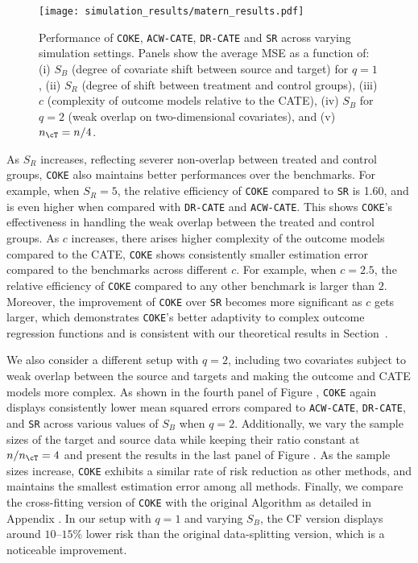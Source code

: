 \documentclass[12pt,a4paper,pdftex,onepage]{article}
\begin{document}
\begin{figure}[htbp!]
\centering
\texttt{[image: simulation\_results/matern\_results.pdf]}
\caption{Performance of \texttt{COKE}, \texttt{ACW-CATE}, \texttt{DR-CATE} and \texttt{SR} across varying simulation settings. Panels show the average MSE as a function of: (i) $S_B$ (degree of covariate shift between source and target) for $q = 1$, (ii) $S_R$ (degree of shift between treatment and control groups), (iii) $c$ (complexity of outcome models relative to the CATE), (iv) $S_B$ for $q = 2$ (weak overlap on two-dimensional covariates), and (v) $n_{\cT}=n/4$.}
\label{fig:matern}
\end{figure}

As $S_R$ increases, reflecting severer non-overlap between treated and control groups, \texttt{COKE} also maintains better performances over the benchmarks. For example, when $S_R = 5$, the relative efficiency of \texttt{COKE} compared to \texttt{SR} is 1.60, and is even higher when compared with \texttt{DR-CATE} and \texttt{ACW-CATE}. This shows \texttt{COKE}’s effectiveness in handling the weak overlap between the treated and control groups. As $c$ increases, there arises higher complexity of the outcome models compared to the CATE, \texttt{COKE} shows consistently smaller estimation error compared to the benchmarks across different $c$. For example, when $c = 2.5$, the relative efficiency of \texttt{COKE} compared to any other benchmark is larger than $2$. Moreover, the improvement of \texttt{COKE} over \texttt{SR} becomes more significant as $c$ gets larger, which demonstrates \texttt{COKE}'s better adaptivity to complex outcome regression functions and is consistent with our theoretical results in Section~.

We also consider a different setup with $q = 2$, including two covariates subject to weak overlap between the source and targets and making the outcome and CATE models more complex. As shown in the fourth panel of Figure , \texttt{COKE} again displays consistently lower mean squared errors compared to \texttt{ACW-CATE}, \texttt{DR-CATE}, and \texttt{SR} across various values of $S_B$ when $q=2$. Additionally, we vary the sample sizes of the target and source data while keeping their ratio constant at $n / n_{\cT} = 4$ and present the results in the last panel of Figure . As the sample sizes increase, \texttt{COKE} exhibits a similar rate of risk reduction as other methods, and maintains the smallest estimation error among all methods. Finally, we compare the cross-fitting version of \texttt{COKE} with the original Algorithm  as detailed in Appendix . In our setup with $q=1$ and varying $S_B$, the CF version displays around $10$--$15\%$ lower risk than the original data-splitting version, which is a noticeable improvement. 
\end{document}
